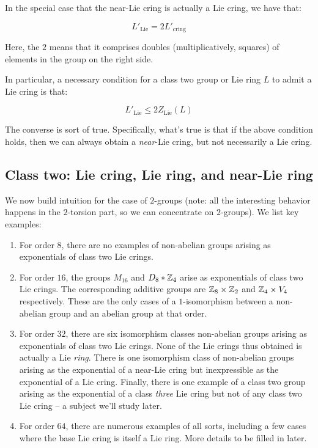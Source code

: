 \documentclass[10pt]{amsart}
\begin{document}
In the special case that the near-Lie cring is actually a Lie cring, we have that:

$$L'_{\text{Lie}} = 2L'_{\text{cring}}$$

Here, the $2$ means that it comprises doubles (multiplicatively,
squares) of elements in the group on the right side.

In particular, a necessary condition for a class two group or Lie ring
$L$ to admit a Lie cring is that:

$$L'_{\text{Lie}} \le 2Z_{\text{Lie}}(L)$$

The converse is sort of true. Specifically, what's true is that if the
above condition holds, then we can always obtain a {\em near}-Lie
cring, but not necessarily a Lie cring.

\subsection{Class two: Lie cring, Lie ring, and near-Lie ring}

We now build intuition for the case of $2$-groups (note: all the
interesting behavior happens in the $2$-torsion part, so we can
concentrate on $2$-groups). We list key examples:

\begin{enumerate}
\item For order $8$, there are no examples of non-abelian groups
  arising as exponentials of class two Lie crings.
\item For order $16$, the groups $M_{16}$ and $D_8 * \mathbb{Z}_4$ arise as
  exponentials of class two Lie crings. The corresponding additive
  groups are $\mathbb{Z}_8 \times \mathbb{Z}_2$ and $\mathbb{Z}_4 \times V_4$
  respectively. These are the only cases of a $1$-isomorphism between
  a non-abelian group and an abelian group at that order.
\item For order $32$, there are six isomorphism classes non-abelian
  groups arising as exponentials of class two Lie crings. None of the
  Lie crings thus obtained is actually a Lie {\em ring}. There is one
  isomorphism class of non-abelian groups arising as the exponential
  of a near-Lie cring but inexpressible as the exponential of a Lie
  cring. Finally, there is one example of a class two group arising as
  the exponential of a class {\em three} Lie cring but not of any
  class two Lie cring -- a subject we'll study later.
\item For order $64$, there are numerous examples of all sorts,
  including a few cases where the base Lie cring is itself a Lie
  ring. More details to be filled in later.
\end{enumerate}
\end{document}
